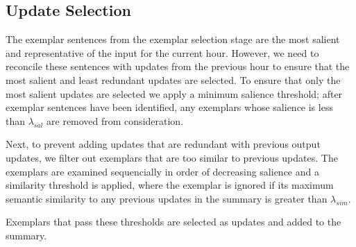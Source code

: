 \subsection{Update Selection}
\label{sec:upsel}

The exemplar sentences from the exemplar selection stage are the most 
salient and representative of the input for the current hour. However,
we need to reconcile these sentences with updates from the previous hour
to ensure that the most salient and least redundant  updates are selected.
To 
ensure that only the most salient updates are selected we apply a minimum
salience threshold;
after exemplar sentences have been identified, any exemplars whose salience is 
less than $\lambda_{sal}$ are removed from consideration. 

 Next,
to prevent adding updates that are redundant with previous output updates, 
we filter out exemplars
that are too similar to previous updates.
The exemplars are examined
sequencially in order of decreasing salience and  a similarity threshold 
is applied, where the exemplar is ignored if its
maximum semantic similarity to any previous updates in the summary is
greater than $\lambda_{sim}$.

Exemplars that pass these thresholds are selected as updates and added
to the summary.




